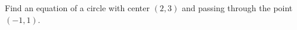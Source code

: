 \begin{frame}

\begin{example}
Find an equation of a circle with center  $(2,3)$ and passing through the point $(-1,1)$.
\end{example}

\end{frame}
